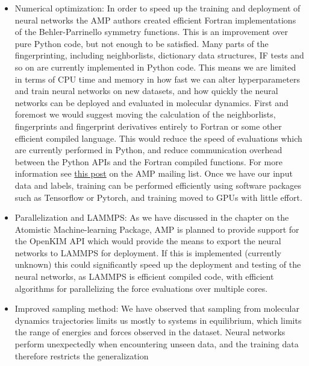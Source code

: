 \begin{itemize}
    \item Numerical optimization:
        In order to speed up the training and deployment of neural
        networks the AMP authors created efficient Fortran implementations
        of the Behler-Parrinello symmetry functions.
        This is an improvement over pure Python code, but not enough to
        be satisfied.
        Many parts of the fingerprinting, including neighborlists,
        dictionary data structures, IF tests and so on are currently
        implemented in Python code. This means we are limited in terms
        of CPU time and memory in how fast we can alter hyperparameters
        and train neural networks on new datasets, and how quickly
        the neural networks can be deployed and evaluated in molecular dynamics.
        First and foremost we would suggest moving the calculation of
        the neighborlists, fingerprints and fingerprint derivatives entirely
        to Fortran or some other efficient compiled language.
        This would reduce the speed of evaluations which are currently performed
        in Python, and reduce communication overhead between the Python APIs
        and the Fortran compiled functions.
        For more information see \href{
            https://listserv.brown.edu/cgi-bin/wa?A2=AMP-USERS;d7c6c98c.1904}{
            this post} on the AMP mailing list.
        Once we have our input data and labels, training can be performed
        efficiently using software packages such as Tensorflow or Pytorch,
        and training moved to GPUs with little effort.
    \item Parallelization and LAMMPS:
        As we have discussed in the chapter on the Atomistic Machine-learning Package,
        AMP is planned to provide support for the OpenKIM API which would provide
        the means to export the neural networks to LAMMPS for deployment.
        If this is implemented (currently unknown) this could significantly speed up
        the deployment and testing of the neural networks, as LAMMPS is efficient compiled
        code, with efficient algorithms for parallelizing the force evaluations over multiple
        cores.
    \item Improved sampling method:
        We have observed that sampling from molecular dynamics trajectories
        limits us mostly to systems in equilibrium, which limits the
        range of energies and forces observed in the dataset.
        Neural networks perform unexpectedly when encountering unseen data,
        and the training data therefore restricts the generalization

\end{itemize}

